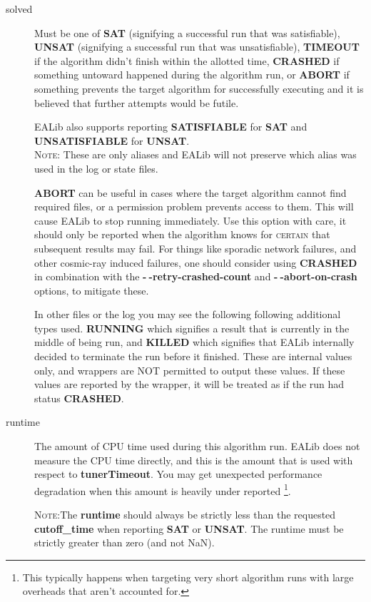 \documentclass[manual.tex]{subfiles}
\begin{document}
\begin{description}

\item [{solved}] Must be one of \textbf{SAT} (signifying a successful run that was satisfiable), \textbf{UNSAT} (signifying a successful run that was unsatisfiable), \textbf{TIMEOUT} if the algorithm didn't finish within the allotted time, \textbf{CRASHED} if something untoward happened during the algorithm run, or \textbf{ABORT} if something prevents the target algorithm for successfully executing and it is believed that further attempts would be futile. 

EALib also supports reporting \textbf{SATISFIABLE} for \textbf{SAT} and \textbf{UNSATISFIABLE} for \textbf{UNSAT}.
\\ \textsc{Note:} These are only aliases and EALib will not preserve which alias was used in the log or state files.

\textbf{ABORT} can be useful in
cases where the target algorithm cannot find required files, or a
permission problem prevents access to them. This will cause EALib to
stop running immediately. Use this option with care, it should only be reported when the algorithm knows for \textsc{certain} that subsequent results may fail. For things like sporadic network failures, and other cosmic-ray induced failures, one should consider using \textbf{CRASHED} in combination with the \textbf{-$\!~$-retry-crashed-count}  and \textbf{-$~\!\!$-abort-on-crash} options, to mitigate these.

In other files or the log you may see the following following additional types used. \textbf{RUNNING} which signifies a result that is currently in the middle of being run, and \textbf{KILLED} which signifies that EALib internally decided to terminate the run before it finished. These are internal values only, and wrappers are NOT permitted to output these values. If these values are reported by the wrapper, it will be treated as if the run had status \textbf{CRASHED}.

\item [{runtime}] The amount of CPU time used during this algorithm run.
EALib does not measure the CPU time directly, and this is the amount
that is used with respect to \textbf{tunerTimeout}. You may get
unexpected performance degradation when this amount is heavily under
reported \footnote{This typically happens when targeting very short algorithm
runs with large overheads that aren't accounted for.}. 

\textsc{Note:}The \textbf{runtime }should always be strictly less
than the requested \textbf{cutoff\_time } when reporting \textbf{SAT
}or \textbf{UNSAT}. The runtime must be strictly greater than zero (and not NaN).


\end{description}
\end{document}
